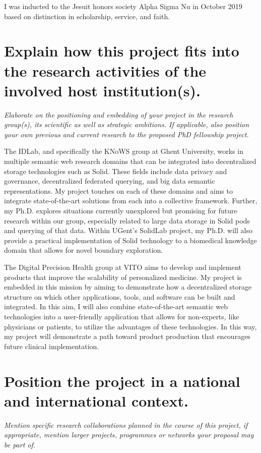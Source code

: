 {I was inducted to the Jesuit honors society Alpha Sigma Nu in October 2019 based on distinction in scholarship, service, and faith.



\section{Explain how this project fits into the research activities of the involved host institution(s).}
\textit{
Elaborate on the positioning and embedding of your project in the research group(s), its scientific as well as strategic ambitions. 
If applicable, also position your own previous and current research to the proposed PhD fellowship project.
}

The IDLab, and specifically the KNoWS group at Ghent University, works in multiple semantic web research domains that can be integrated into decentralized storage technologies such as Solid.
These fields include data privacy and governance, decentralized federated querying, and big data semantic representations.
My project touches on each of these domains and aims to integrate state-of-the-art solutions from each into a collective framework.
Further, my Ph.D. explores situations currently unexplored but promising for future research within our group, especially related to large data storage in Solid pods and querying of that data.
Within UGent's SolidLab project, my Ph.D. will also provide a practical implementation of Solid technology to a biomedical knowledge domain that allows for novel boundary exploration.

The Digital Precision Health group at VITO aims to develop and implement products that improve the scalability of personalized medicine.
My project is embedded in this mission by aiming to demonstrate how a decentralized storage structure on which other applications, tools, and software can be built and integrated. 
In this aim, I will also combine state-of-the-art semantic web technologies into a user-friendly application that allows for non-experts, like physicians or patients, to utilize the advantages of these technologies.
In this way, my project will demonstrate a path toward product production that encourages future clinical implementation.



\section{Position the project in a national and international context.}
\textit{
Mention specific research collaborations planned in the course of this project, if appropriate, mention larger projects, programmes or networks your proposal may be part of.
}

}
